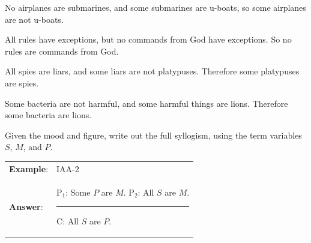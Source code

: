 \begin{exercises}
\item No airplanes are submarines, and some submarines are u-boats, so some airplanes are not u-boats.

 
\item All rules have exceptions, but no commands from God have exceptions. So no rules are commands from God. 

 
\item All spies are liars, and some liars are not platypuses. Therefore some platypuses are spies.

 
\item Some bacteria are not harmful, and some harmful things are lions. Therefore some bacteria are lions. 
%
     
\end{exercises} 
 
\noindent\problempart Given the mood and figure, write out the full syllogism, using the term variables $S$, $M$, and $P$. 
\begin{longtabu}{p{.1\linewidth}p{.9\linewidth}} 
\textbf{Example}: &IAA-2 \\ 
\textbf{Answer}: & P$_1$: Some $P$ are $M$. \newline
P$_2$: All $S$ are $M$. 
\vskip -6pt
\rule{0.2\linewidth}{.5pt} \newline
C: All $S$ are $P$.
\end{longtabu} 

